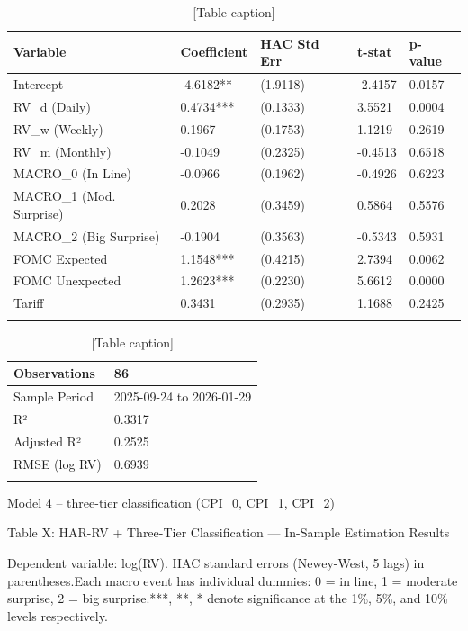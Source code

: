 \documentclass[12pt,a4paper]{report}
\begin{document}
\begin{table}[H]
\centering
\begin{tabular}{|l|l|l|l|l|}
\hline
Variable & Coefficient & HAC Std Err & t-stat & p-value \\
\hline
Intercept & -4.6182** & (1.9118) & -2.4157 & 0.0157 \\
\hline
RV_d (Daily) & 0.4734*** & (0.1333) & 3.5521 & 0.0004 \\
\hline
RV_w (Weekly) & 0.1967 & (0.1753) & 1.1219 & 0.2619 \\
\hline
RV_m (Monthly) & -0.1049 & (0.2325) & -0.4513 & 0.6518 \\
\hline
MACRO_0 (In Line) & -0.0966 & (0.1962) & -0.4926 & 0.6223 \\
\hline
MACRO_1 (Mod. Surprise) & 0.2028 & (0.3459) & 0.5864 & 0.5576 \\
\hline
MACRO_2 (Big Surprise) & -0.1904 & (0.3563) & -0.5343 & 0.5931 \\
\hline
FOMC Expected & 1.1548*** & (0.4215) & 2.7394 & 0.0062 \\
\hline
FOMC Unexpected & 1.2623*** & (0.2230) & 5.6612 & 0.0000 \\
\hline
Tariff & 0.3431 & (0.2935) & 1.1688 & 0.2425 \\
\hline
 &  &  &  &  \\
\hline
\end{tabular}
\caption{[Table caption]}
\end{table}
\begin{table}[H]
\centering
\begin{tabular}{|l|l|}
\hline
Observations & 86 \\
\hline
Sample Period & 2025-09-24 to 2026-01-29 \\
\hline
R² & 0.3317 \\
\hline
Adjusted R² & 0.2525 \\
\hline
RMSE (log RV) & 0.6939 \\
\hline
 &  \\
\hline
\end{tabular}
\caption{[Table caption]}
\end{table}
Model 4 -- three-tier classification (CPI_0, CPI_1, CPI_2)

Table X: HAR-RV + Three-Tier Classification --- In-Sample Estimation Results

Dependent variable: log(RV). HAC standard errors (Newey-West, 5 lags) in parentheses.Each macro event has individual dummies: 0 = in line, 1 = moderate surprise, 2 = big surprise.***, **, * denote significance at the 1\%, 5\%, and 10\% levels respectively.
\end{document}
